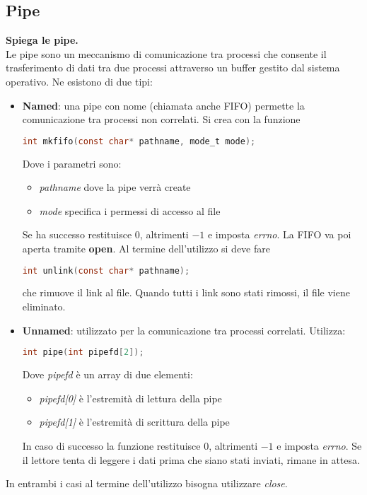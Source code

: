 \subsection{Pipe}
\textbf{Spiega le pipe.}\\
Le pipe sono un meccanismo di comunicazione tra processi che consente il trasferimento di dati tra due processi attraverso un buffer gestito dal sistema operativo.
Ne esistono di due tipi:
\begin{itemize}
	\item \textbf{Named}: una pipe con nome (chiamata anche FIFO) permette la comunicazione tra processi non correlati. Si crea con la funzione
	\begin{lstlisting}[language=C]
		int mkfifo(const char* pathname, mode_t mode);
	\end{lstlisting}
	Dove i parametri sono:
	\begin{itemize}
		\item \textit{pathname} dove la pipe verrà create
		\item \textit{mode} specifica i permessi di accesso al file
	\end{itemize}
	Se ha successo restituisce $0$, altrimenti $-1$ e imposta \textit{errno}. La FIFO va poi aperta tramite \textbf{open}. Al termine dell'utilizzo si deve fare
	\begin{lstlisting}[language=C]
		int unlink(const char* pathname);
	\end{lstlisting}
	che rimuove il link al file. Quando tutti i link sono stati rimossi, il file viene eliminato.
	\item \textbf{Unnamed}: utilizzato per la comunicazione tra processi correlati. Utilizza:
	\begin{lstlisting}[language=C]
		int pipe(int pipefd[2]);
	\end{lstlisting}
	Dove \textit{pipefd} è un array di due elementi:
	\begin{itemize}
		\item \textit{pipefd[0]} è l'estremità di lettura della pipe
		\item \textit{pipefd[1]} è l'estremità di scrittura della pipe
	\end{itemize}
	In caso di successo la funzione restituisce $0$, altrimenti $-1$ e imposta \textit{errno}. Se il lettore tenta di leggere i dati prima che siano stati inviati, rimane in attesa.
\end{itemize}
In entrambi i casi al termine dell'utilizzo bisogna utilizzare \textit{close}.